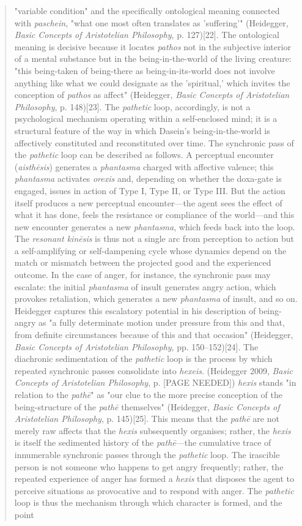 \documentclass{article}
\begin{document}
\begin{quote}
"variable condition" and the specifically ontological meaning connected with \textit{paschein}, "what one most often translates as 'suffering'" (Heidegger, \textit{Basic Concepts of Aristotelian Philosophy}, p. 127)[22]. The ontological meaning is decisive because it locates \textit{pathos} not in the subjective interior of a mental substance but in the being-in-the-world of the living creature: "this being-taken of being-there as being-in-its-world does not involve anything like what we could designate as the 'spiritual,' which invites the conception of \textit{pathos} as affect" (Heidegger, \textit{Basic Concepts of Aristotelian Philosophy}, p. 148)[23]. The \textit{pathetic} loop, accordingly, is not a psychological mechanism operating within a self-enclosed mind; it is a structural feature of the way in which Dasein's being-in-the-world is affectively constituted and reconstituted over time. The synchronic pass of the \textit{pathetic} loop can be described as follows. A perceptual encounter (\textit{aisthēsis}) generates a \textit{phantasma} charged with affective valence; this \textit{phantasma} activates \textit{orexis} and, depending on whether the doxa-gate is engaged, issues in action of Type I, Type II, or Type III. But the action itself produces a new perceptual encounter---the agent sees the effect of what it has done, feels the resistance or compliance of the world---and this new encounter generates a new \textit{phantasma}, which feeds back into the loop. The \textit{resonant kinēsis} is thus not a single arc from perception to action but a self-amplifying or self-dampening cycle whose dynamics depend on the match or mismatch between the projected good and the experienced outcome. In the case of anger, for instance, the synchronic pass may escalate: the initial \textit{phantasma} of insult generates angry action, which provokes retaliation, which generates a new \textit{phantasma} of insult, and so on. Heidegger captures this escalatory potential in his description of being-angry as "a fully determinate motion under pressure from this and that, from definite circumstances because of this and that occasion" (Heidegger, \textit{Basic Concepts of Aristotelian Philosophy}, pp. 150--152)[24]. The diachronic sedimentation of the \textit{pathetic} loop is the process by which repeated synchronic passes consolidate into \textit{hexeis}. (Heidegger 2009, \textit{Basic Concepts of Aristotelian Philosophy}, p. [PAGE NEEDED]) \textit{hexis} stands "in relation to the \textit{pathē}" as "our clue to the more precise conception of the being-structure of the \textit{pathē} themselves" (Heidegger, \textit{Basic Concepts of Aristotelian Philosophy}, p. 145)[25]. This means that the \textit{pathē} are not merely raw affects that the \textit{hexis} subsequently organises; rather, the \textit{hexis} is itself the sedimented history of the \textit{pathē}---the cumulative trace of innumerable synchronic passes through the \textit{pathetic} loop. The irascible person is not someone who happens to get angry frequently; rather, the repeated experience of anger has formed a \textit{hexis} that disposes the agent to perceive situations as provocative and to respond with anger. The \textit{pathetic} loop is thus the mechanism through which character is formed, and the point 
\end{quote}
\end{document}
